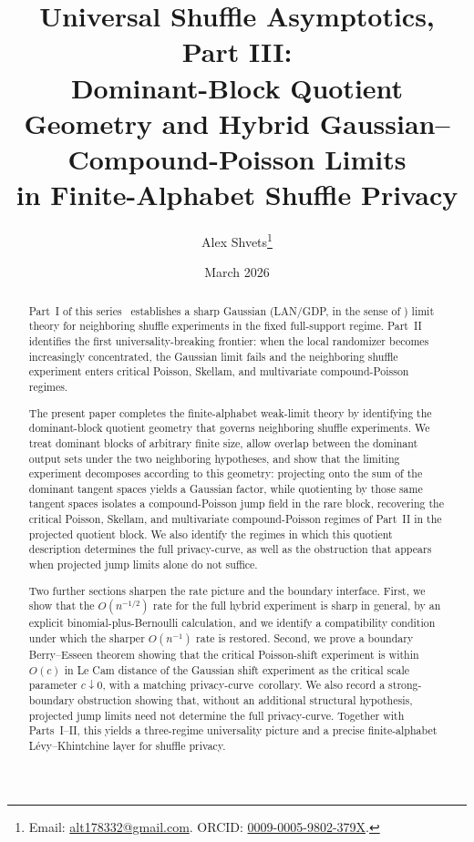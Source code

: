 \documentclass{article}
\title{Universal Shuffle Asymptotics, Part III:\\
Dominant-Block Quotient Geometry and Hybrid Gaussian--Compound-Poisson Limits\\
in Finite-Alphabet Shuffle Privacy}
\author{Alex Shvets\thanks{Email: \href{mailto:alt178332@gmail.com}{alt178332@gmail.com}. ORCID: \href{https://orcid.org/0009-0005-9802-379X}{0009-0005-9802-379X}.}}
\date{March 2026}
\newcommand{\1}{\mathbf 1}
\newcommand{\privacycurve}{\mbox{privacy-curve}}
\begin{document}
\maketitle

\begin{abstract}

Part~I of this series~\cite{Shv26I} establishes a sharp Gaussian (LAN/GDP, in the sense of \cite{DRS22})
limit theory for neighboring shuffle experiments in the fixed full-support regime. Part~II~\cite{Shv26II}
identifies the first universality-breaking frontier: when the local randomizer becomes increasingly concentrated,
the Gaussian limit fails and the neighboring shuffle experiment enters critical Poisson, Skellam, and multivariate
compound-Poisson regimes.

The present paper completes the finite-alphabet weak-limit theory by identifying the
dominant-block quotient geometry that governs neighboring shuffle experiments. We treat
dominant blocks of arbitrary finite size, allow overlap between the dominant output sets
under the two neighboring hypotheses, and show that the limiting experiment decomposes
according to this geometry: projecting onto the sum of the dominant tangent spaces yields
a Gaussian factor, while quotienting by those same tangent spaces isolates a
compound-Poisson jump field in the rare block, recovering the critical Poisson, Skellam,
and multivariate compound-Poisson regimes of Part~II in the projected quotient block.
We also identify the regimes in which this quotient description determines the full
\privacycurve, as well as the obstruction that appears when projected jump limits alone
do not suffice.

Two further sections sharpen the rate picture and the boundary interface. First, we show that the
$O(n^{-1/2})$ rate for the full hybrid experiment is sharp in general, by an explicit binomial-plus-Bernoulli
calculation, and we identify a compatibility condition under which the sharper $O(n^{-1})$ rate is restored.
Second, we prove a boundary Berry--Esseen theorem showing that the critical Poisson-shift experiment is within
$O(c)$ in Le Cam distance of the Gaussian shift experiment as the critical scale parameter $c\downarrow 0$,
with a matching \privacycurve\ corollary. We also record a strong-boundary obstruction showing that, without an
additional structural hypothesis, projected jump limits need not determine the full \privacycurve. Together with
Parts~I--II, this yields a three-regime universality picture and a precise finite-alphabet L\'evy--Khintchine
layer for shuffle privacy.

\end{abstract}
\end{document}

